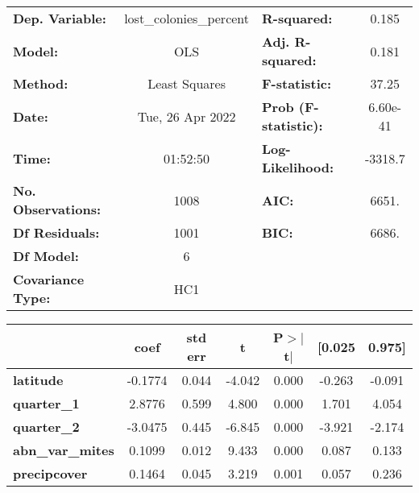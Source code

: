 \begin{center}
\begin{tabular}{lclc}
\toprule
\textbf{Dep. Variable:}    & lost\_colonies\_percent & \textbf{  R-squared:         } &    0.185  \\
\textbf{Model:}            &           OLS           & \textbf{  Adj. R-squared:    } &    0.181  \\
\textbf{Method:}           &      Least Squares      & \textbf{  F-statistic:       } &    37.25  \\
\textbf{Date:}             &     Tue, 26 Apr 2022    & \textbf{  Prob (F-statistic):} & 6.60e-41  \\
\textbf{Time:}             &         01:52:50        & \textbf{  Log-Likelihood:    } &  -3318.7  \\
\textbf{No. Observations:} &            1008         & \textbf{  AIC:               } &    6651.  \\
\textbf{Df Residuals:}     &            1001         & \textbf{  BIC:               } &    6686.  \\
\textbf{Df Model:}         &               6         & \textbf{                     } &           \\
\textbf{Covariance Type:}  &           HC1           & \textbf{                     } &           \\
\bottomrule
\end{tabular}
\end{center}\begin{center}
\begin{tabular}{lcccccc}
\toprule
                         & \textbf{coef} & \textbf{std err} & \textbf{t} & \textbf{P$> |$t$|$} & \textbf{[0.025} & \textbf{0.975]}  \\
\midrule
\textbf{latitude}        &      -0.1774  &        0.044     &    -4.042  &         0.000        &       -0.263    &       -0.091     \\
\textbf{quarter\_1}      &       2.8776  &        0.599     &     4.800  &         0.000        &        1.701    &        4.054     \\
\textbf{quarter\_2}      &      -3.0475  &        0.445     &    -6.845  &         0.000        &       -3.921    &       -2.174     \\
\textbf{abn\_var\_mites} &       0.1099  &        0.012     &     9.433  &         0.000        &        0.087    &        0.133     \\
\textbf{precipcover}     &       0.1464  &        0.045     &     3.219  &         0.001        &        0.057    &        0.236     \\

\end{tabular}
\end{center}
